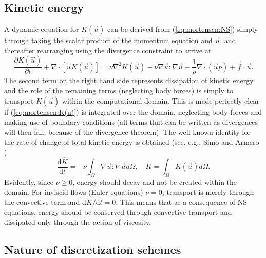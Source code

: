 \subsection{Kinetic energy}
\label{sec:mortensen:kinetic}
A dynamic equation for $K(\vec{u})$ can be derived from (\eqref{eq:mortensen:NS}) simply through taking the scalar product of the momentum equation and $\vec{u}$, and thereafter rearranging using the divergence constraint to arrive at
\begin{equation}
 \frac{\partial K(\vec{u})}{\partial t} + \nabla \cdot [\vec{u}K(\vec{u})] = \nu \nabla^2 K(\vec{u}) -\nu \nabla \vec{u} : \nabla \vec{u} - \frac{1}{\rho}\nabla \cdot \left(\vec{u}p \right) +\vec{f}\cdot \vec{u}. 
 \label{eq:mortensen:K(u)}
\end{equation}
The second term on the right hand side represents dissipation of kinetic energy and the role of the remaining terms (neglecting body forces) is simply to transport $K(\vec{u})$ within the computational domain. This is made perfectly clear if (\eqref{eq:mortensen:K(u)}) is integrated over the domain, neglecting body forces and making use of boundary conditions (all terms that can be written as divergences will then fall, because of the divergence theorem). The well-known identity for the rate of change of total kinetic energy is obtained (see, e.g., Simo and Armero \cite{simo94})
\begin{equation}
 \frac{\text{d} \overline{K} }{\text{d} t} = - \nu \int_\Omega \nabla \vec{u} : \nabla \vec{u} d\Omega,
\quad \overline{K} = \int_{\Omega} K(\vec{u})d\Omega .
\end{equation}
Evidently, since $\nu \ge 0$, energy should decay and not be created within the domain. For inviscid flows (Euler equations) $\nu=0$, transport is merely through the convective term and $\text{d} \overline{K}/\text{d} t = 0$. This means that as a consequence of NS equations, energy should be conserved through convective transport and dissipated only through the action of viscosity.
\subsection{Nature of discretization schemes}
\label{sec:mortensen:dissipative:dispersive}

